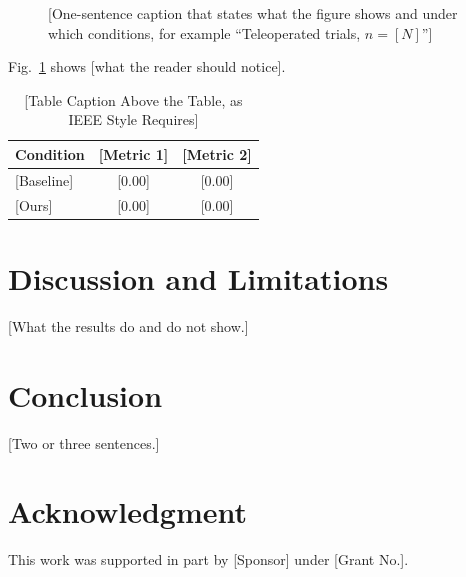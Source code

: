 \documentclass[conference]{IEEEtran}
\newif\ifanonymous
\begin{document}
\begin{figure}[t]
  \centering
  \caption{[One-sentence caption that states what the figure shows and under
  which conditions, for example ``Teleoperated trials, $n=[N]$'']}
  \label{fig:overview}
\end{figure}

Fig.~\ref{fig:overview} shows [what the reader should notice].

\begin{table}[t]
  \caption{[Table Caption Above the Table, as IEEE Style Requires]}
  \label{tab:results}
  \centering
  \begin{tabular}{lcc}
    \hline
    Condition & [Metric 1] & [Metric 2] \\
    \hline
    {[Baseline]} & {[0.00]} & {[0.00]} \\
    {[Ours]}     & {[0.00]} & {[0.00]} \\
    \hline
  \end{tabular}
\end{table}

\section{Discussion and Limitations}
[What the results do and do not show.]

\section{Conclusion}
[Two or three sentences.]

\ifanonymous\else
\section*{Acknowledgment}
This work was supported in part by [Sponsor] under [Grant No.].
\fi



\end{document}
